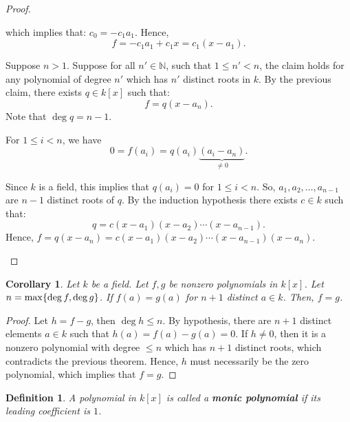 \documentclass[a4paper,12pt]{report}
\newcounter{statement}
\numberwithin{statement}{chapter}
\newtheorem{defn}[statement]{Definition}
\newtheorem{cor}[statement]{Corollary}
\numberwithin{equation}{chapter}
\numberwithin{section}{chapter}
\numberwithin{subsection}{section}
\begin{document}
\begin{proof}
\begin{enumerate}
which implies that: $c_0 = - c_1a_1$.  Hence,
\[
f = -c_1a_1 + c_1 x = c_1(x - a_1).
\]

Suppose $n > 1$.
Suppose for all $n' \in \mathbb{N}$, such that $1 \leq n' < n$,
the claim holds for any polynomial of degree $n'$ which has $n'$ distinct roots in $k$.
By the previous claim, there exists $q \in k[x]$ such that:
\[
f = q(x - a_n).
\]
Note that $\deg q = n - 1$.




For $1 \leq i < n$, we have
\[
0 = f(a_i) = q(a_i)\underbrace{(a_i - a_n)}_{\neq 0}.
\]

Since $k$ is a field, this implies that $q(a_i) = 0$ for $1 \leq i < n$.
So, $a_1, a_2,\ldots, a_{n - 1}$ are $n - 1$ distinct roots of $q$.
By the induction hypothesis there exists $c \in k$ such that:
\[
q = c(x - a_1)(x - a_2)\cdots(x - a_{n - 1}).
\]
Hence, $f = q(x - a_n) = c(x - a_1)(x - a_2)\cdots(x - a_{n - 1})(x - a_n)$.


\end{enumerate}




\end{proof}

\begin{cor}
Let $k$ be a field.  Let $f, g$ be nonzero polynomials in $k[x]$.
Let $n = {\rm max}\{\deg f, \deg g\}$.
If $f(a) = g(a)$ for $n + 1$ distinct $a \in k$.  Then, $f = g$.
\end{cor}
\begin{proof}

Let $h = f - g$, then $\deg h \leq n$.  By hypothesis, there are $n + 1$ distinct elements $a \in k$
such that $h(a) = f(a) - g(a) = 0$.  If $h \neq 0$,
then it is a nonzero polynomial with degree $\leq n$ which has $n + 1$ distinct roots,
which contradicts the previous theorem.
Hence, $h$ must necessarily be the zero polynomial, which implies that $f = g$.


\end{proof}







\begin{defn}
A polynomial in $k[x]$ is called a  {\bf monic polynomial}  if its leading coefficient is $1$.
\end{defn}
\end{document}
